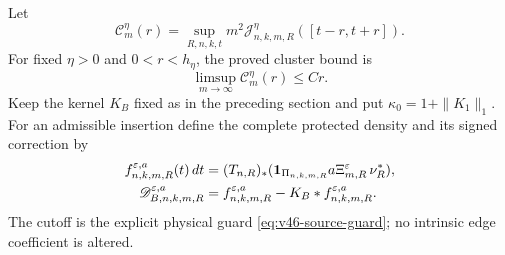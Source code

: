 Let
\begin{equation}\label{eq:v46-cluster-budget}
 \mathcal C_m^{\eta}(r)=
      \sup_{R,n,k,t}m^2
          \mathcal J^{\eta}_{n,k,m,R}([t-r,t+r]).
\end{equation}
For fixed $\eta>0$ and $0<r<h_\eta$, the proved cluster bound is
\begin{equation}\label{eq:v46-cluster-budget-limit}
 \limsup_{m\to\infty}\mathcal C_m^{\eta}(r)\le Cr.
\end{equation}
Keep the kernel $K_B$ fixed as in the preceding section and put
$\kappa_0=1+\|K_1\|_1$. For an admissible insertion define the complete
protected density and its signed correction by
\begin{align}
 f^{\varepsilon,a}_{n,k,m,R}(t)\,dt
    &=(T_{n,R})_*(\one_{\Pi_{n,k,m,R}}
                         a\Xi_{m,R}^{\varepsilon}\,\nu_R^*),\notag\\
 \mathscr D^{\varepsilon,a}_{B,n,k,m,R}
    &=f^{\varepsilon,a}_{n,k,m,R}
                         -K_B*f^{\varepsilon,a}_{n,k,m,R}.
                                      \label{eq:v46-protected-correction}
\end{align}
The cutoff is the explicit physical guard
\eqref{eq:v46-source-guard}; no intrinsic edge coefficient is altered.

